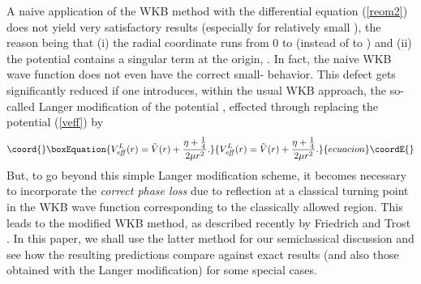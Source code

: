 \documentclass[a4paper,aps,eqsecnum,preprint,preprintnumbers,12pt]{revtex4}
\begin{document}
A naive application of the WKB method with the differential
equation (\ref{reom2}) does not yield very satisfactory results
(especially for relatively small \coordHE{}), the reason being that (i)
the radial coordinate \coordHE{} runs from 0 to \myHighlight{$\infty$}\coordHE{} (instead of
\myHighlight{$-\infty$}\coordHE{} to \myHighlight{$\infty$}\coordHE{}) and (ii) the potential contains a singular
term at the origin, \coordHE{}. In
fact, the naive WKB wave function does not even have the correct
small-\coordHE{} behavior. This defect gets significantly reduced if one
introduces, within the usual WKB approach, the so-called Langer
modification of the potential \cite{langer}, effected through
replacing the potential (\ref{veff}) by
\begin{equation}\coord{}\boxEquation{
V_{\it eff}^{L}(r) = \tilde{V}(r) + \frac{ \eta + \frac{1}{4} }{
2\mu r^{2} }.
}{
V_{\it eff}^{L}(r) = \tilde{V}(r) + \frac{ \eta + \frac{1}{4} }{
2\mu r^{2} }.
}{ecuacion}\coordE{}\end{equation}
But, to go beyond this simple Langer modification scheme, it
becomes necessary to incorporate the {\it correct phase loss} due
to reflection at a classical turning point in the WKB wave
function corresponding to the classically allowed region. This
leads to the modified WKB method, as described recently by
Friedrich and Trost \cite{friedrich}. In this paper, we shall use
the latter method for our semiclassical discussion and see how the
resulting predictions compare against exact results (and also
those obtained with the Langer modification) for some special
cases.
\end{document}
